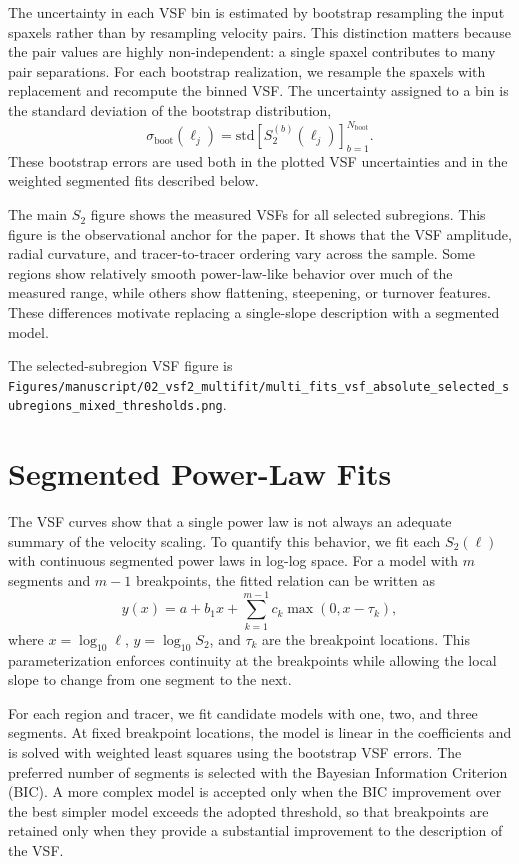 The uncertainty in each VSF bin is estimated by bootstrap resampling the input
spaxels rather than by resampling velocity pairs. This distinction matters
because the pair values are highly non-independent: a single spaxel contributes
to many pair separations. For each bootstrap realization, we resample the
spaxels with replacement and recompute the binned VSF. The uncertainty assigned
to a bin is the standard deviation of the bootstrap distribution,
\begin{equation}
    \sigma_{\mathrm{boot}}(\ell_j)
    =
    \mathrm{std}
    \left[
    S_2^{(b)}(\ell_j)
    \right]_{b=1}^{N_{\mathrm{boot}}}.
\end{equation}
These bootstrap errors are used both in the plotted VSF uncertainties and in
the weighted segmented fits described below.

The main $S_2$ figure shows the measured VSFs for all selected subregions.
This figure is the observational anchor for the paper. It shows that the VSF
amplitude, radial curvature, and tracer-to-tracer ordering vary across the
sample. Some regions show relatively smooth power-law-like behavior over much
of the measured range, while others show flattening, steepening, or turnover
features. These differences motivate replacing a single-slope description with
a segmented model.

The selected-subregion VSF figure is
\texttt{Figures/manuscript/02\_vsf2\_multifit/multi\_fits\_vsf\_absolute\_selected\_subregions\_mixed\_thresholds.png}.

\section{Segmented Power-Law Fits}
\label{sec:segmented-fits}

The VSF curves show that a single power law is not always an adequate summary
of the velocity scaling. To quantify this behavior, we fit each $S_2(\ell)$
with continuous segmented power laws in log-log space. For a model with $m$
segments and $m-1$ breakpoints, the fitted relation can be written as
\begin{equation}
    y(x)
    =
    a + b_1 x
    +
    \sum_{k=1}^{m-1} c_k \max(0,x-\tau_k),
\end{equation}
where $x=\log_{10}\ell$, $y=\log_{10}S_2$, and $\tau_k$ are the breakpoint
locations. This parameterization enforces continuity at the breakpoints while
allowing the local slope to change from one segment to the next.

For each region and tracer, we fit candidate models with one, two, and three
segments. At fixed breakpoint locations, the model is linear in the
coefficients and is solved with weighted least squares using the bootstrap VSF
errors. The preferred number of segments is selected with the Bayesian
Information Criterion (BIC). A more complex model is accepted only when the BIC
improvement over the best simpler model exceeds the adopted threshold, so that
breakpoints are retained only when they provide a substantial improvement to
the description of the VSF.

